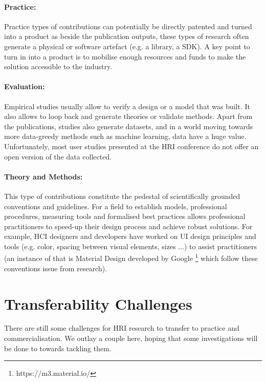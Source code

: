 \documentclass[letterpaper]{article} %
\begin{document}
\paragraph{Practice:} Practice types of contributions can potentially be directly patented and turned into a product as beside the publication outputs, these types of research often generate a physical or software artefact (e.g. a library, a SDK). 
A key point to turn in into a product is to mobilise enough resources and funds to make the solution accessible to the industry.

\paragraph{Evaluation:} Empirical studies usually allow to verify a design or a model that was built. It also allows to loop back and generate theories or validate methods. Apart from the publications, studies also generate datasets, and in a world moving towards more data-greedy methods such as machine learning, data have a huge value. Unfortunately, most user studies presented at the HRI conference do not offer an open version of the data collected. 

\paragraph{Theory and Methods:} This type of contributions constitute the pedestal of scientifically grounded conventions and guidelines. For a field to establish models, professional procedures, measuring tools and formalised best practices allows professional practitioners to speed-up their design process and achieve robust solutions. 
For example, HCI designers and developers have worked on UI design principles and tools (e.g. color, spacing between visual elements, sizes ...) to assist practitioners (an instance of that is Material Design developed by Google \footnote{https://m3.material.io/}  which follow these conventions issue from research).


\section{Transferability Challenges}
There are still some challenges for HRI research to transfer to practice and commercialisation. We outlay a couple here, hoping that some investigations will be done to towards tackling them. 
\end{document}
